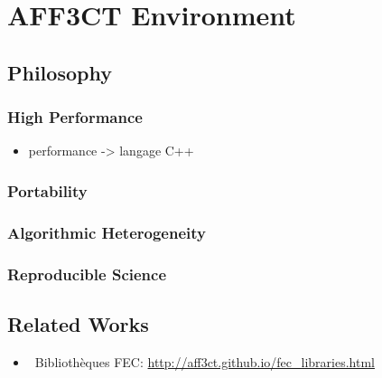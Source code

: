 \graphicspath{{main/chapter4/fig/}}

\chapter{AFF3CT Environment}

\section{Philosophy~\cite{Cassagne2019a}}

\subsection{High Performance}

\begin{itemize}
  \item performance -> langage C++
\end{itemize}

\subsection{Portability}

\subsection{Algorithmic Heterogeneity}

\subsection{Reproducible Science}

\section{Related Works}

\begin{itemize}
  \item \cmark~Bibliothèques FEC: \url{http://aff3ct.github.io/fec_libraries.html}
\end{itemize}


